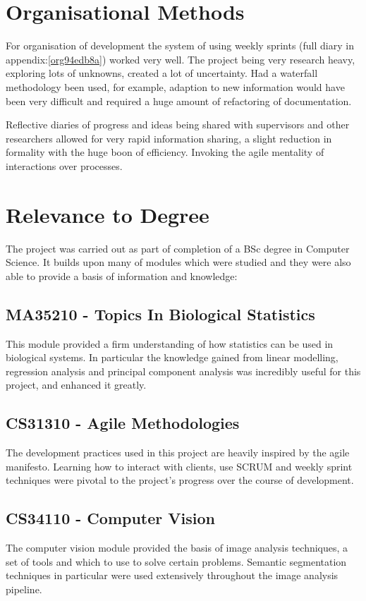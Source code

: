 \documentclass[11pt]{report}
\begin{document}
\section{Organisational Methods}
\label{sec:orgb3e0d4b}
For organisation of development the system of using weekly sprints (full diary in appendix:\ref{org94edb8a}) worked very well. The project being very research heavy, exploring lots of unknowns, created a lot of uncertainty. Had a waterfall methodology been used, for example, adaption to new information would have been very difficult and required a huge amount of refactoring of documentation.

Reflective diaries of progress and ideas being shared with supervisors and other researchers allowed for very rapid information sharing, a slight reduction in formality with the huge boon of efficiency. Invoking the agile mentality of interactions over processes.

\section{Relevance to Degree}
\label{sec:orgacb48e6}
The project was carried out as part of completion of a BSc degree in Computer Science. It builds upon many of modules which were studied and they were also able to provide a basis of information and knowledge:

\subsection{MA35210 - Topics In Biological Statistics}
\label{sec:orgc1da81a}
This module provided a firm understanding of how statistics can be used in biological systems. In particular the knowledge gained from linear modelling, regression analysis and principal component analysis was incredibly useful for this project, and enhanced it greatly.
\subsection{CS31310 - Agile Methodologies}
\label{sec:orgcb56d0d}
The development practices used in this project are heavily inspired by the agile manifesto. Learning how to interact with clients, use SCRUM and weekly sprint techniques were pivotal to the project's progress over the course of development.
\subsection{CS34110 - Computer Vision}
\label{sec:org8b2e3c2}
The computer vision module provided the basis of image analysis techniques, a set of tools and which to use to solve certain problems. Semantic segmentation techniques in particular were used extensively throughout the image analysis pipeline.
\end{document}
